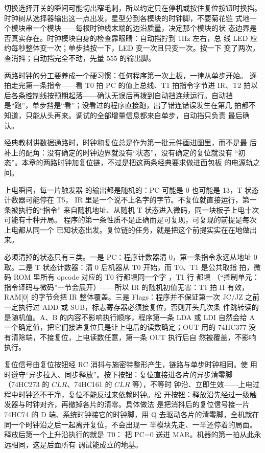 切换选择开关的瞬间可能切出窄毛刺，所以约定只在停机或按住复位按钮时换挡。时钟树从选择器输出这一点出发，星型分到各模块的时钟脚，不要菊花链
式地一个模块串一个模块——每根时钟线末端的边沿质量，决定那个模块的状
态边界是否真实存在。时钟模块自身的检查靠眼睛：自动挡拧到 1Hz 左右，总
线 LED 应约每秒整体变一次；单步挡按一下，LED 变一次且只变一次。按一下
变了两次，查消抖；自动挡完全不动，先量 555 的输出脚。

两路时钟的分工要养成一个硬习惯：任何程序第一次上板，一律从单步开始。
逐拍走完第一条指令——看 T0 拍 PC 的值上总线、T1 拍指令字节进 IR、T2
拍以后各条控制线按预期起落——确认无误后再拨到自动挡连续运行。自动挡
是“跑”，单步挡是“看”；没看过的程序直接跑，出了错连错误发生在第几
拍都不知道，只能从头再来。调试的全部增量信息都来自单步，自动挡只负责
最后确认。

\begin{classicnote}
经典教材讲数据通路时，时钟和复位总是作为第一批元件画进图里，而不是最
后补上的配角：没有确定的时钟边界就没有“状态”，没有确定的复位就没有
“初态”。本章的两路时钟加复位链，不过是把这两条经典要求做进面包板
的电源轨之间。
\end{classicnote}

上电瞬间，每一片触发器
的输出都是随机的：PC 可能是 0 也可能是 13，T 状态计数器可能停在 T5，
IR 里是一个说不上名字的字节。不复位就直接运行，第一条被执行的“指令”
来自随机地址、从随机 T 状态进入微码，同一块板子上电十次可能有十种开局。
程序的第一条性质不是正确而是可复现，可复现的前提是每次上电都从同一个
已知状态出发。复位链的任务，就是把这个前提实实在在地做出来。

必须清掉的状态只有三类。一是 PC：程序计数器清 0，第一条指令永远从地址
0 取。二是 T 状态计数器：清 0 后机器从 T0 开始，而 T0、T1 是公共取指
拍，微码 ROM 里所有 opcode 对应的 T0 行都填同一个字 ，T1 行
都填 （“控制单元：指令译码与微码”一节会展开）——所以 IR 的随机初值无害：T1 拍 II
有效，RAM[0] 的字节会把 IR 整体覆盖。三是 Flags：程序并不保证第一次
JC/JZ 之前一定执行过 ADD 或 SUB，标志寄存器必须接复位，否则开头几次条
件跳转读的是随机值。A、B 的内容不影响执行顺序，程序第一条 LDA 或
LDI 自然会给 A 一个确定值，把它们接进复位只是让上电后的读数确定；OUT
用的 74HC377 没有清除端，不接复位，上电读数任意，第一条 OUT 执行后自
然被覆盖，不影响执行。

复位信号由复位按钮经 RC 消抖与施密特整形产生，链路与单步时钟相同。使
用时遵守“异步拉入、同步释放”。按下按钮：复位直接进各片的异步清零脚
（74HC273 的 $\overline{CLR}$、74HC161 的 $\overline{CLR}$ 等），不等时
钟沿、立即生效——上电过程中时钟还不干净，复位不能反过来依赖时钟。松
开按钮：释放沿先经过一级触发器与时钟对齐，再撤掉各片的清零。具体做法
是把消抖后的复位信号接一片 74HC74 的 D 端、系统时钟接它的时钟脚，用 Q
去驱动各片的清零脚，全机就在同一个时钟沿之后一起离开复位，不会出现一
半模块先走、一半还停着的局面。释放后第一个上升沿执行的就是 T0：
 把 PC=0 送进 MAR。机器的第一拍从此永远相同，这是后面所有
调试能成立的地基。

